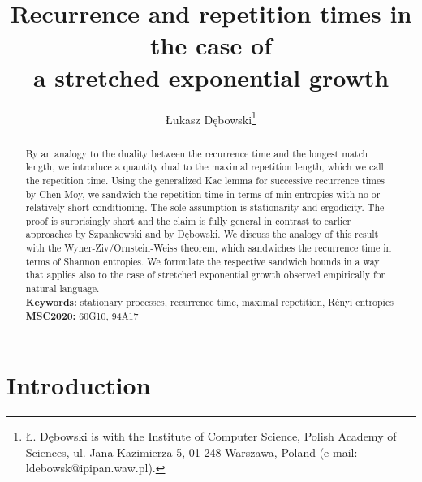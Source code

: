 \documentclass[a4paper]{article}
\author{{\L}ukasz D\k{e}bowski\thanks{
    {\L}. D\k{e}bowski is with
    the Institute of Computer Science, Polish Academy of Sciences, 
    ul. Jana Kazimierza 5, 01-248 Warszawa, Poland 
    (e-mail: ldebowsk@ipipan.waw.pl).
  }
}
\title{Recurrence and repetition times in the case of \\ a stretched
  exponential growth} \date{}
\begin{document}
\maketitle

\begin{abstract}
  By an analogy to the duality between the recurrence time and the
  longest match length, we introduce a quantity dual to the maximal
  repetition length, which we call the repetition time.  Using the
  generalized Kac lemma for successive recurrence times by Chen Moy,
  we sandwich the repetition time in terms of min-entropies with no or
  relatively short conditioning. The sole assumption is stationarity
  and ergodicity. The proof is surprisingly short and the claim is
  fully general in contrast to earlier approaches by Szpankowski and
  by D\k{e}bowski. We discuss the analogy of this result with the
  Wyner-Ziv/Ornstein-Weiss theorem, which sandwiches the recurrence
  time in terms of Shannon entropies. We formulate the respective
  sandwich bounds in a way that applies also to the case of stretched
  exponential growth observed empirically for natural language.
%
  \\[1em]
  \textbf{Keywords:} stationary processes, recurrence time, maximal
  repetition, R\'enyi entropies
  \\[1em]
  \textbf{MSC2020:} 60G10, 94A17
\end{abstract}





\section{Introduction}
\label{secIntroduction}
\end{document}
